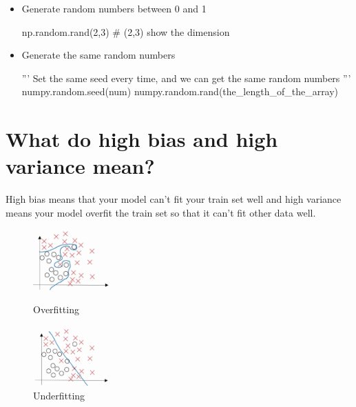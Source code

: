 \documentclass{article}
\begin{document}
\begin{enumerate}
\begin{itemize}
\item Generate random numbers between 0 and 1
\begin{python}
np.random.rand(2,3) # (2,3) show the dimension
\end{python}

\item Generate the same random numbers
\begin{python}
'''
Set the same seed every time,
and we can get the same random numbers
'''
numpy.random.seed(num)
numpy.random.rand(the_length_of_the_array)
\end{python}

\end{itemize}


\end{enumerate} 

\section{What do high bias and high variance mean?}
\indent High bias means that your model can't fit your train set well and high variance means your model overfit the train set so that it can't fit other data well.

\begin{figure}[htbp]

\begin{minipage}[t]{0.45\linewidth}
\centering
\includegraphics[width=3cm]{overfit.png}
\caption{Overfitting}
\label{overfitting}
\end{minipage}
\hfill %
\begin{minipage}[t]{0.45\linewidth}
\centering
\includegraphics[width=3cm]{underfitting.png}
\caption{Underfitting}
\label{underfitting}
\end{minipage}
\end{figure}
\end{document}

